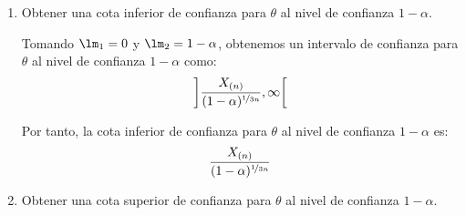 \begin{ejercicio}
\begin{enumerate}
    
        Como $\lm_2 - \lm_1 = 1 - \alpha$, podemos sustituir $\lm_2 = \lm_1 + 1 - \alpha$ en la función que queremos minimizar:
        \begin{align*}
            F(\lambda_1) = \lm_1^{-\nicefrac{1}{3n}} - (\lm_1 + 1 - \alpha)^{-\nicefrac{1}{3n}}
        \end{align*}

        Calculamos la derivada de $F(\lambda_1)$:
        \begin{align*}
            F'(\lambda_1) &= -\frac{1}{3n}\lm_1^{-\nicefrac{1}{3n}-1} + \frac{1}{3n}(\lm_1 + 1 - \alpha)^{-\nicefrac{1}{3n}-1} \\
            &= \frac{1}{3n}\left[(\lm_1 + 1 - \alpha)^{-\nicefrac{1}{3n}-1} - \lm_1^{-\nicefrac{1}{3n}-1}\right]
        \end{align*}

        Como $0<\lm_1<\lm_1+1-\alpha\le 1$ y la potencia $-\nicefrac{1}{3n}-1$ negativa es estrictamente decreciente, tenemos que $\lm_1^{-\nicefrac{1}{3n}-1} > (\lm_1 + 1 - \alpha)^{-\nicefrac{1}{3n}-1}$, por lo que se tiene que $F'(\lambda_1) < 0$. Por lo tanto, la función es estrictamente decreciente en el dominio de la restricción, y por tanto el mínimo se encuentra en el extremo derecho del dominio, con $\lm_1 = \alpha$ y $\lm_2 = 1$. Por lo tanto, el intervalo de confianza para $\theta$ al nivel de confianza $1 - \alpha$ es:
        \begin{align*}
            \left]X_{(n)}, \dfrac{X_{(n)}}{\alpha^{\nicefrac{1}{3n}}}\right[
        \end{align*}

        \item Obtener una cota inferior de confianza para $\theta$ al nivel de confianza $1 - \alpha$.
        
        Tomando $\lm_1 = 0$ y $\lm_2 = 1 - \alpha$, obtenemos un intervalo de confianza para $\theta$ al nivel de confianza $1 - \alpha$ como:
        \begin{align*}
            \left]\dfrac{X_{(n)}}{(1-\alpha)^{\nicefrac{1}{3n}}}, \infty\right[
        \end{align*}

        Por tanto, la cota inferior de confianza para $\theta$ al nivel de confianza $1 - \alpha$ es:
        \begin{align*}
            \dfrac{X_{(n)}}{(1-\alpha)^{\nicefrac{1}{3n}}}
        \end{align*}

        \item Obtener una cota superior de confianza para $\theta$ al nivel de confianza $1 - \alpha$.
        

\end{enumerate}
\end{ejercicio}
